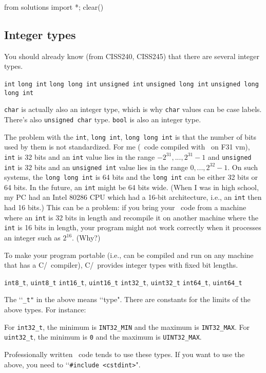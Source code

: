 \begin{python0}
from solutions import *; clear()
\end{python0}

\subsection{Integer types}

You should already know (from CISS240, CISS245) that there
are several integer types.
\begin{myenum}
  \li \verb!int!
  \li \verb!long int!
  \li \verb!long long int!
  \li \verb!unsigned int!
  \li \verb!unsigned long int!
  \li \verb!unsigned long long int!
\end{myenum}
\verb!char! is actually also an integer type,
which is why \verb!char! values can be case labels.
There's also \verb!unsigned char! type.
\verb!bool! is also an integer type.

The problem with the \verb!int!, \verb!long int!,
\verb!long long int! is that the
number of bits used by them is not standardized.
For me (\cpp\ code compiled with \gpp\ on F31 vm),
\verb!int! is 32 bits and an \verb!int!
value lies in the range $-2^{31}, ..., 2^{31} - 1$
and \verb!unsigned int! is 32 bits and an \verb!unsigned int!
value lies in the range $0, ..., 2^{32} - 1$.
On such systems, the \verb!long long int! is 64 bits
and the \verb!long int! can be either 32 bits or 64 bits.
In the future, an \verb!int! might be 64 bits wide.
(When I was in high school, my PC had an
Intel 80286 CPU which had a 16-bit
architecture, i.e., an \verb!int! then had 16 bits.)
This can be a problem:
if you bring your \cpp\ code from a machine where an \verb!int!
is 32 bits in length and recompile it on another machine where
the \verb!int! is 16 bits in length,
your program might not work correctly when it processes
an integer such as $2^{16}$.
(Why?)

To make your program portable (i.e., can be compiled and
run on any machine that has a C/\cpp\ compiler),
C/\cpp\ provides integer types with fixed bit lengths.
\begin{myenum}
\li \verb!int8_t!, \verb!uint8_t!
\li \verb!int16_t!, \verb!uint16_t!
\li \verb!int32_t!, \verb!uint32_t!
\li \verb!int64_t!, \verb!uint64_t!
\end{myenum}
The \lq\lq \verb!_t"! in the above means \lq\lq type".
There are constants for the limits of the above types.
For instance:
\begin{myenum}
\li 
  For \verb!int32_t!,
  the minimum is \verb!INT32_MIN! and
  the maximum is \verb!INT32_MAX!.
\li
  For \verb!uint32_t!,
  the minimum is \verb!0! and
  the maximum is \verb!UINT32_MAX!.
\end{myenum}
Professionally written \cpp\ code tends to use these types.
If you want to use the above, you need to \lq\lq\verb!#include <cstdint>!".


